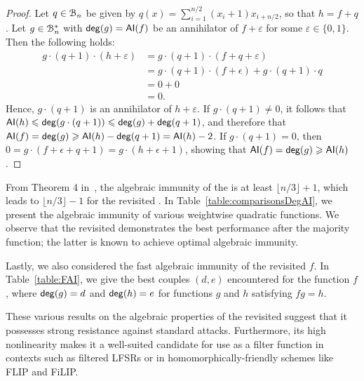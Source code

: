 \documentclass{llncs}
\begin{document}
\begin{proof}
	Let $q\in\mathcal{B}_n$ be given by $q(x)=\sum_{i=1}^{n/2} (x_i+1) x_{i+n/2}$, so that $h=f+q$.
	Let $g\in\mathcal{B}_n^*$ with $\mathsf{deg}(g)=\mathsf{AI}(f)$ be an annihilator of $f+ \varepsilon$ for some $\varepsilon\in\{0,1\}$. Then the following holds:
	\begin{align*}
		g\cdot(q+1) \cdot(h+\varepsilon)&= g\cdot(q+1)\cdot(f+q+\varepsilon)\\
		&=g\cdot(q+1)\cdot(f+\epsilon)+g\cdot(q+1)\cdot q\\
		&=0+0\\
		&=0.
	\end{align*}
	Hence, $g\cdot(q+1)$ is an annihilator of $h+ \varepsilon$. If $g\cdot(q+1)\ne 0$, it follows that $\mathsf{AI}(h)\leqslant\mathsf{deg}(g\cdot(q+1))\leqslant\mathsf{deg}(g)+\mathsf{deg}(q+1)$, and therefore that $\mathsf{AI}(f)=\mathsf{deg}(g)\geqslant\mathsf{AI}(h)-\mathsf{deg}(q+1)=\mathsf{AI}(h)-2$. If $g\cdot(q+1)=0$, then $0=g\cdot(f+\epsilon+q+1)=g\cdot(h+\epsilon+1)$, showing that $\mathsf{AI}(f)=\mathsf{deg}(g)\geqslant\mathsf{AI}(h)$.
\end{proof}

From Theorem 4 in~\cite{DAM:WCST14}, the algebraic immunity of the \hwbf{} is at least $\lfloor n/3\rfloor +1$, which leads to $\lfloor n/3\rfloor -1$ for the revisited \hwbf{}. In Table~\ref{table:comparisonsDegAI}, we present the algebraic immunity of various weightwise quadratic functions. We observe that the revisited \hwbf{} demonstrates the best performance after the majority function; the latter is known to achieve optimal algebraic immunity.

Lastly, we also considered the fast algebraic immunity of the revisited \hwbf{} $f$. In Table~\ref{table:FAI}, we give the best couples $(d,e)$ encountered for the function $f$, where $\mathsf{deg}(g)=d$ and $\mathsf{deg}(h)=e$ for functions $g$ and $h$ satisfying $fg=h$.

\bigskip

These various results on the algebraic properties of the revisited \hwbf{} suggest that it possesses strong resistance against standard attacks. Furthermore, its high nonlinearity makes it a well-suited candidate for use as a filter function in contexts such as filtered \textsf{LFSR}s or in homomorphically-friendly schemes like \textsf{FLIP} and \textsf{FiLIP}.
\end{document}
